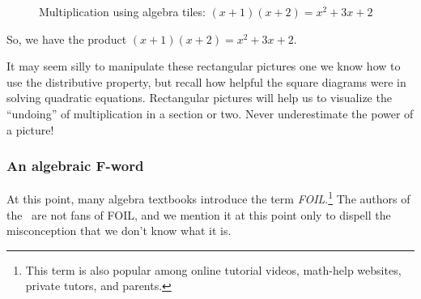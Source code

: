 \begin{figure}
\label{fig:tileproduct}
\begin{minipage}{0.48\textwidth}
\centering
{}
\end{minipage}
\begin{minipage}{0.48\textwidth}
\centering
{}
\end{minipage}
\caption{Multiplication using algebra tiles: $(x+1)(x+2)=x^2+3x+2$}
\end{figure}

So, we have the product $(x+1)(x+2) = x^2 + 3x + 2$.

It may seem silly to manipulate these rectangular pictures one we know how to use the distributive property, but recall how helpful the square diagrams were in solving quadratic equations. Rectangular pictures will help us to visualize the ``undoing'' of multiplication in a section or two. Never underestimate the power of a picture!

\subsubsection{An algebraic {F}-word}

At this point, many algebra textbooks introduce the term \textit{FOIL}.\footnote{This term is also popular among online tutorial videos, math-help websites, private tutors, and parents.} The authors of the \algebranomicon\ are not fans of FOIL, and we mention it at this point only to dispell the misconception that we don't know what it is.

